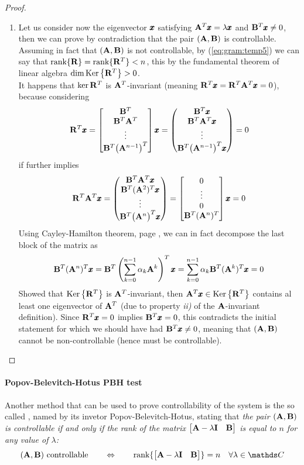 \begin{proof}
\begin{enumerate}[\itshape a)]
			\item Let us consider now the eigenvector $\pmb{x}$ satisfying $\mathbf{A}^T \pmb{x} = \lambda \pmb{x}$ and $\mathbf{B}^T \pmb{x} \neq 0$, then we can prove by contradiction that the pair $(\mathbf{A},\mathbf{B})$ is controllable. Assuming in fact that $(\mathbf{A},\mathbf{B})$ is not controllable, by (\ref{eq:gram:temp5}) we can say that $\textrm{rank}\{\mathbf{R}\} = \textrm{rank}\{\mathbf{R}^T\} < n$, this by the fundamental theorem of linear algebra $\dim \textrm{Ker}\left\{\mathbf{R}^T\right\} > 0$.\\
			It happens that $\ker{\mathbf{R}^T}$ is $\mathbf{A}^T$-invariant (meaning $\mathbf{R}^T \pmb{x} = \mathbf{R}^T\mathbf{A}^T \pmb{x} = 0$), because considering 
			\[ \mathbf{R}^T \pmb{x} = \begin{bmatrix} \mathbf{B}^T \\ \mathbf{B}^T\mathbf{A}^T \\ \vdots \\ \mathbf{B}^T \big(\mathbf{A}^{n-1}\big)^T \end{bmatrix} \pmb{x} = \begin{pmatrix} \mathbf{B}^T\pmb{x} \\ \mathbf{B}^T\mathbf{A}^T\pmb{x} \\ \vdots \\ \mathbf{B}^T \big(\mathbf{A}^{n-1}\big)^T\pmb{x} \end{pmatrix} = 0 \]
			if further implies
			\[ \mathbf{R}^T\mathbf{A}^T \pmb{x} = \begin{pmatrix} \mathbf{B}^T\mathbf{A}^T\pmb{x} \\ \mathbf{B}^T(\mathbf{A}^2)^T\pmb{x} \\ \vdots \\ \mathbf{B}^T \big(\mathbf{A}^{n}\big)^T\pmb{x} \end{pmatrix} = \begin{bmatrix} 0 \\ \vdots \\ 0 \\ \mathbf{B}^T(\mathbf{A}^n)^T \end{bmatrix} \pmb{x} = 0 \]
			Using Cayley-Hamilton theorem, page \pageref{th:cayley}, we can in fact decompose the last block of the matrix as
			\[ \mathbf{B}^T(\mathbf{A}^n)^T \pmb{x} = \mathbf{B}^T \left( \sum_{k=0}^{n-1} \alpha_k \mathbf{A}^k \right)^T \pmb{x} = \sum_{k=0}^{n-1} \alpha_k \mathbf{B}^T(\mathbf{A}^k)^T\pmb{x} = 0 \]
			Showed that $\textrm{Ker}\left\{\mathbf{R}^T\right\}$ is $\mathbf{A}^T$-invariant, then $\mathbf{A}^T\pmb{x} \in \textrm{Ker}\left\{\mathbf{R}^T\right\}$ contains al least one eigenvector of $\mathbf{A}^T$ (due to property \textit{ii)} of the $\mathbf{A}$-invariant definition). Since $\mathbf{R}^T \pmb{x}=0$ implies $\mathbf{B}^T\pmb{x} = 0$, this contradicts the initial statement for which we should have had $\mathbf{B}^T\pmb{x} \neq 0$, meaning that $(\mathbf{A},\mathbf{B})$ cannot be non-controllable (hence must be controllable).			
		\end{enumerate}
	\end{proof}
	
	\paragraph{Popov-Belevitch-Hotus PBH test} Another method that can be used to prove controllability of the system is the so called , named by its invetor Popov-Belevitch-Hotus, stating that {\itshape the pair $(\mathbf{A},\mathbf{B})$ is controllable if and only if the rank of the matrix $\begin{bmatrix} \mathbf{A}-\lambda\mathbf{I}& \mathbf{B} \end{bmatrix}$ is equal to $n$ for any value of $\lambda$:}
	\begin{equation} \label{eq:gram:PBHcontrol}
		(\A,\B) \textrm{ controllable} \qquad \Leftrightarrow \qquad \rank{\matrix{\A-\lambda \I & \B}} = n \quad \forall \lambda \in \mathds C
	\end{equation}
	
